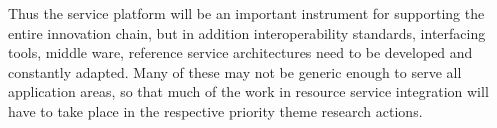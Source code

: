 \documentclass[10pt, plain]{../../metanetpaper}
\begin{document}
\begin{multicols}{2}
Thus the service platform will be an important instrument for supporting the entire innovation chain, but in addition interoperability standards, interfacing tools, middle ware, reference service architectures need to be developed and constantly adapted. Many of these may not be generic enough to serve all application areas, so that much of the work in resource service integration will have to take place in the respective priority theme research actions.





\end{multicols}
\end{document}
